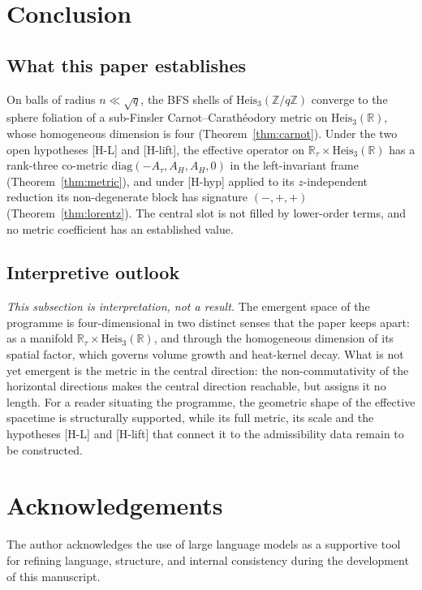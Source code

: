 \documentclass[11pt,a4paper]{article}
\theoremstyle{definition}
\theoremstyle{remark}
\newcommand{\HeisR}{\mathrm{Heis}_3(\mathbb{R})}
\newcommand{\HeisZ}{\mathrm{Heis}_3(\mathbb{Z}/q\mathbb{Z})}
\begin{document}
  \section{Conclusion}
  \label{sec:conclusion}

  \subsection{What this paper establishes}

    On balls of radius $n \ll \sqrt q$, the BFS shells of $\HeisZ$ converge to the sphere foliation of a sub-Finsler
    Carnot--Carath\'eodory metric on $\HeisR$, whose
    homogeneous dimension is four (Theorem~\ref{thm:carnot}).
    Under the two open hypotheses [H-L] and [H-lift], the effective operator on $\mathbb{R}_\tau \times \HeisR$ has a
    rank-three co-metric $\mathrm{diag}(-A_\tau, A_H, A_H, 0)$ in the left-invariant frame
    (Theorem~\ref{thm:metric}), and under [H-hyp] applied to its $z$-independent reduction its non-degenerate
    block has signature $(-,+,+)$
    (Theorem~\ref{thm:lorentz}).
    The central slot is not filled by lower-order terms, and no metric coefficient has an established value.

  \subsection{Interpretive outlook}

    \emph{This subsection is interpretation, not a result.}
    The emergent space of the programme is four-dimensional in two distinct senses that the paper keeps apart: as a
    manifold $\mathbb{R}_\tau \times \HeisR$, and through the homogeneous dimension of its spatial factor, which
    governs volume growth and heat-kernel decay.
    What is not yet emergent is the metric in the central direction: the non-commutativity of the horizontal
    directions makes the central direction reachable, but assigns it no length.
    For a reader situating the programme, the geometric shape of the effective spacetime is structurally supported,
    while its full metric, its scale and the hypotheses [H-L] and [H-lift] that connect it to the admissibility data
    remain to be constructed.

  \section*{Acknowledgements}

  The author acknowledges the use of large language models as a supportive tool for
  refining language, structure, and internal consistency during the development of
  this manuscript.

  
  {\raggedright
  
  }
\end{document}
